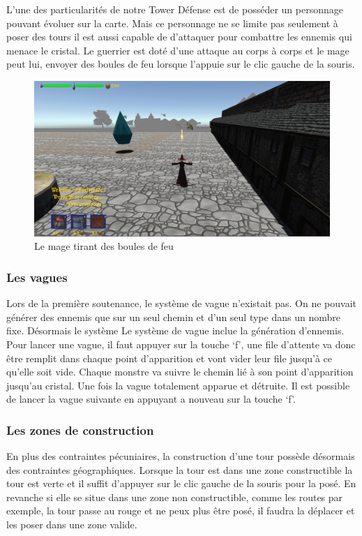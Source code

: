 \documentclass[a4paper, 12pt]{article}
\begin{document}
		L’une des particularités de notre Tower Défense est de posséder un personnage pouvant évoluer sur la carte. Mais ce personnage ne se limite pas seulement à poser des tours il est aussi capable de d’attaquer pour combattre les ennemis qui menace le cristal. Le guerrier est doté d’une attaque au corps à corps et le mage peut lui, envoyer des boules de feu lorsque l’appuie sur le clic gauche de la souris.
		\begin{figure}[!ht]
		\centerline{\includegraphics[scale=0.3]{bouledefeu.png}}
		\caption*{Le mage tirant des boules de feu}
		\end{figure}
		\subsubsection{Les vagues}
		
		Lors de la première soutenance, le système de vague n’existait pas. On ne pouvait générer des ennemis que sur un seul chemin et d’un seul type dans un nombre fixe. Désormais le système 
Le système de vague inclue la génération d’ennemis. Pour lancer une vague, il faut appuyer sur la touche ‘f’, une file d’attente va donc être remplit dans chaque point d’apparition et vont vider leur file jusqu’à ce qu’elle soit vide. Chaque monstre va suivre le chemin lié à son point d’apparition jusqu’au cristal. Une fois la vague totalement apparue et détruite. Il est possible de lancer la vague suivante en appuyant a nouveau sur la touche ‘f’.

		\subsubsection{Les zones de construction}
	En plus des contraintes pécuniaires, la construction d’une tour possède désormais des contraintes géographiques. Lorsque la tour est dans une zone constructible la tour est verte et il suffit d’appuyer sur le clic gauche de la souris pour la posé. En revanche si elle se situe dans une zone non constructible, comme les routes par exemple, la tour passe au rouge et ne peux plus être posé, il faudra la déplacer et les poser dans une zone valide.
\end{document}
